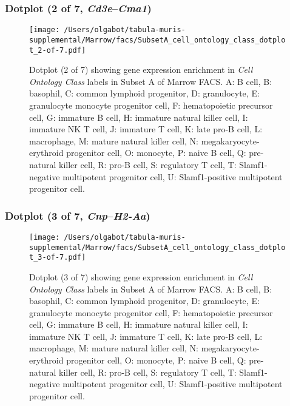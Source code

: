 \subsubsection{Dotplot (2 of 7, \emph{Cd3e}--\emph{Cma1})}
\begin{figure}[h]
\centering
\texttt{[image: /Users/olgabot/tabula-muris-supplemental/Marrow/facs/SubsetA\_cell\_ontology\_class\_dotplot\_2-of-7.pdf]}

\caption{ Dotplot (2 of 7)  showing gene expression enrichment in \emph{Cell Ontology Class} labels in Subset A of Marrow FACS. A: B cell, B: basophil, C: common lymphoid progenitor, D: granulocyte, E: granulocyte monocyte progenitor cell, F: hematopoietic precursor cell, G: immature B cell, H: immature natural killer cell, I: immature NK T cell, J: immature T cell, K: late pro-B cell, L: macrophage, M: mature natural killer cell, N: megakaryocyte-erythroid progenitor cell, O: monocyte, P: naive B cell, Q: pre-natural killer cell, R: pro-B cell, S: regulatory T cell, T: Slamf1-negative multipotent progenitor cell, U: Slamf1-positive multipotent progenitor cell.}
\end{figure}


\clearpage

\subsubsection{Dotplot (3 of 7, \emph{Cnp}--\emph{H2-Aa})}
\begin{figure}[h]
\centering
\texttt{[image: /Users/olgabot/tabula-muris-supplemental/Marrow/facs/SubsetA\_cell\_ontology\_class\_dotplot\_3-of-7.pdf]}

\caption{ Dotplot (3 of 7)  showing gene expression enrichment in \emph{Cell Ontology Class} labels in Subset A of Marrow FACS. A: B cell, B: basophil, C: common lymphoid progenitor, D: granulocyte, E: granulocyte monocyte progenitor cell, F: hematopoietic precursor cell, G: immature B cell, H: immature natural killer cell, I: immature NK T cell, J: immature T cell, K: late pro-B cell, L: macrophage, M: mature natural killer cell, N: megakaryocyte-erythroid progenitor cell, O: monocyte, P: naive B cell, Q: pre-natural killer cell, R: pro-B cell, S: regulatory T cell, T: Slamf1-negative multipotent progenitor cell, U: Slamf1-positive multipotent progenitor cell.}
\end{figure}


\clearpage

